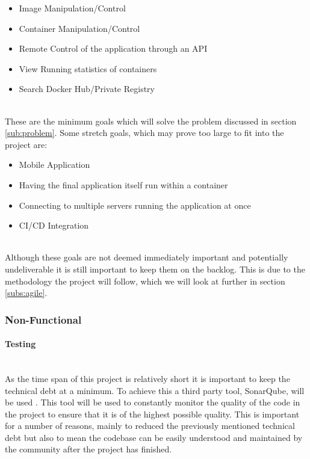 \begin{itemize}
  \item Image Manipulation/Control
  \item Container Manipulation/Control
  \item Remote Control of the application through an \gls{API}
  \item View Running statistics of containers
  \item Search Docker Hub/Private Registry 
\end{itemize}
\mbox{}\\
These are the minimum goals which will solve the problem discussed in section \ref{sub:problem}. Some stretch goals, which may prove too large to fit into the project are:
\mbox{}\\
\begin{itemize}
  \item Mobile Application
  \item Having the final application itself run within a container
  \item Connecting to multiple servers running the application at once
  \item CI/CD Integration
\end{itemize}
\mbox{}\\
Although these goals are not deemed immediately important and potentially undeliverable it is still important to keep them on the backlog. This is due to the methodology the project will follow, which we will look at further in section \ref{subs:agile}.

\subsubsection{Non-Functional}

\paragraph{Testing}\mbox{}\\
As the time span of this project is relatively short it is important to keep the \gls{technical debt} at a minimum. To achieve this a third party tool, SonarQube, will be used \citep{Sonar2016}. This tool will be used to constantly monitor the quality of the code in the project to ensure that it is of the highest possible quality. This is important for a number of reasons, mainly to reduced the previously mentioned technical debt but also to mean the codebase can be easily understood and maintained by the community after the project has finished. 

